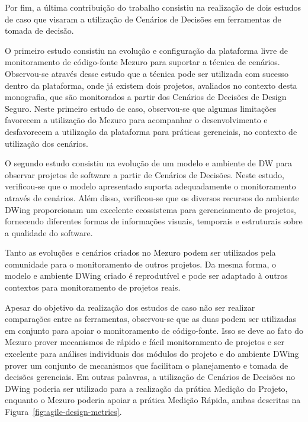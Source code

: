 %

Por fim, a última contribuição do trabalho consistiu na realização de dois estudos de caso que visaram a utilização de Cenários de Decisões em ferramentas de tomada de decisão. 

O primeiro estudo consistiu na evolução e configuração da plataforma livre de monitoramento de código-fonte Mezuro para suportar a técnica de cenários. Observou-se através desse estudo que a técnica pode ser utilizada com sucesso dentro da plataforma, onde já existem dois projetos, avaliados no contexto desta monografia, que são monitorados a partir dos Cenários de Decisões de Design Seguro. Neste primeiro estudo de caso, observou-se que algumas limitações favorecem a utilização do Mezuro para acompanhar o desenvolvimento e desfavorecem a utilização da plataforma para práticas gerenciais, no contexto de utilização dos cenários.

O segundo estudo consistiu na evolução de um modelo e ambiente de DW para observar projetos de software a partir de Cenários de Decisões. Neste estudo, verificou-se que o modelo apresentado suporta adequadamente o monitoramento através de cenários. Além disso, verificou-se que os diversos recursos do ambiente DWing proporcionam um excelente ecossistema para gerenciamento de projetos, fornecendo diferentes formas de informações visuais, temporais e estruturais sobre a qualidade do software. 

Tanto as evoluções e cenários criados no Mezuro podem ser utilizados pela comunidade para o monitoramento de outros projetos. Da mesma forma, o modelo e ambiente DWing criado é reprodutível e pode ser adaptado à outros contextos para monitoramento de projetos reais.


Apesar do objetivo da realização dos estudos de caso não ser realizar comparações entre as ferramentas, observou-se que as duas podem ser utilizadas em conjunto para apoiar o monitoramento de código-fonte. Isso se deve ao fato do Mezuro prover mecanismos de rápido e fácil monitoramento de projetos e ser excelente para análises individuais dos módulos do projeto e do ambiente DWing prover um conjunto de mecanismos que facilitam o planejamento e tomada de decisões gerenciais. Em outras palavras, a utilização de Cenários de Decisões no DWing poderia ser utilizado para a realização da prática Medição do Projeto, enquanto o Mezuro poderia apoiar a prática Medição Rápida, ambas descritas na Figura~\ref{fig:agile-design-metrics}.



